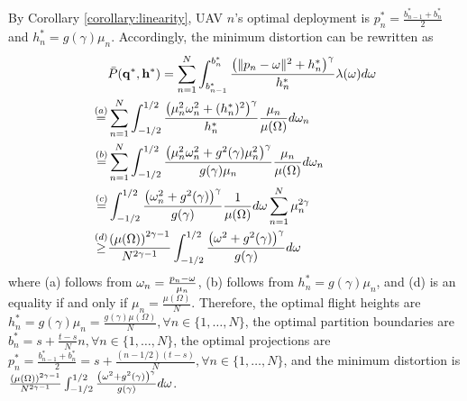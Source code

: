 \documentclass[smallabstract,smallcaptions]{dccpaper}
\renewcommand{\vp}{\mathbf q}
\newcommand{\df}{\ensuremath{\lam}}         %
\newcommand{\bP}{\ensuremath{\vp}}          %
\newcommand{\abPo}{\ensuremath{\bar{P}}}  %
\newcommand{\bH}{\ensuremath{\vh}}          %
\newcommand{\Vor}{\ensuremath{\mathcal{V}}}         %
\newcommand{\philippstart}{\color{black}}
\newcommand{\philippend}{\color{black}}
\newcommand{\junend}{\color{black}}
\begin{document}
By Corollary \ref{corollary:linearity}, UAV $n$'s optimal deployment is $p^*_n=\frac{b^*_{n-1}+b^*_{n}}{2}$ and $h^*_n=g(\gamma)\mu_n$.
Accordingly, the minimum distortion can be rewritten as
\begin{align}
    &\abPo(\bP^*,\bH^*)=\sum_{n=1}^{N}\int_{b^*_{n-1}}^{b^*_{n}}\frac{\left(\|p_n-\ome\|^2+h^*_n\right)^{\gamma}}{h^*_n}\df(\ome) d\ome\\
    \overset{(a)}{=}&\sum_{n=1}^{N}\int_{-1/2}^{1/2} \frac{\left(\mu^2_n\ome^2_n+(h^*_n)^2\right)^{\gamma}}{h^*_n} \frac{\mu_n}{\mu(\Omega)}d\ome_n\\
    \overset{(b)}{=}&\sum_{n=1}^{N}\int_{-1/2}^{1/2}\frac{\left(\mu^2_n\ome^2_n+g^2(\gamma)\mu^2_n\right)^{\gamma}}{g(\gamma)\mu_n} \frac{\mu_n}{\mu(\Omega)}d\ome_n\\
    \overset{(c)}{=}&\int_{-1/2}^{1/2}\frac{\left(\ome^2_n+g^2(\gamma)\right)^{\gamma}}{g(\gamma)} \frac{1}{\mu(\Omega)}d\ome\sum_{n=1}^{N}\mu^{2\gamma}_n\\
    \overset{(d)}{\ge}&\frac{\left(\mu(\Omega)\right)^{2\gamma-1}}{N^{2\gamma-1}}\int_{-1/2}^{1/2}\frac{\left(\ome^2+g^2(\gamma)\right)^{\gamma}}{g(\gamma)} d\ome
  \end{align}
where (a) follows from $\omega_n=\frac{p_n-\omega}{\mu_n}$, (b) follows from $h^*_n=g(\gamma)\mu_n$, and (d) is an equality if and only if $\mu_n=\frac{\mu(\Omega)}{N}$.
Therefore, the optimal flight heights are $h^*_n=g(\gamma)\mu_n=\frac{g(\gamma)\mu(\Omega)}{N}, \forall n\in\{1,\dots,N\}$, the optimal partition boundaries are $b^*_n=s+\frac{t-s}{N}n, \forall n\in\{1,\dots,N\}$, the optimal projections are $p^*_n=\frac{b^*_{n-1}+b^*_{n}}{2}=s+\frac{(n-1/2)(t-s)}{N}, \forall n\in\{1,\dots,N\}$, and the minimum distortion is $\frac{\left(\mu(\Omega)\right)^{2\gamma-1}}{N^{2\gamma-1}}\int_{-1/2}^{1/2}\frac{\left(\omega^2+g^2(\gamma)\right)^{\gamma}}{g(\gamma)} d\omega$.
\fi
\junend
\philippstart
%
\philippend
%
%
\vspace{-4ex}
\printbibliography
\end{document}
